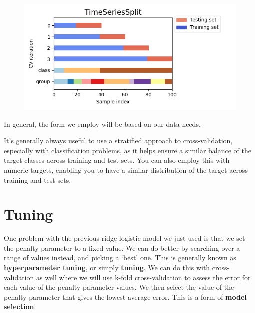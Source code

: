 \documentclass[
  letterpaper,
]{krantz}
\begin{document}
\begin{figure}
\begin{minipage}{0.50\linewidth}
\end{minipage}%
%
\begin{minipage}{0.50\linewidth}

\includegraphics{img/sklearn_k_fold_images/time_series.png}

\end{minipage}%

\end{figure}%

In general, the form we employ will be based on our data needs.

\begin{tcolorbox}[enhanced jigsaw, bottomrule=.15mm, rightrule=.15mm, colframe=quarto-callout-tip-color-frame, colback=white, breakable, arc=.35mm, left=2mm, opacityback=0, leftrule=.75mm, toprule=.15mm]

It's generally always useful to use a stratified approach to
cross-validation, especially with classification problems, as it helps
ensure a similar balance of the target classes across training and test
sets. You can also employ this with numeric targets, enabling you to
have a similar distribution of the target across training and test sets.

\end{tcolorbox}

\section{Tuning}\label{sec-ml-tuning}

One problem with the previous ridge logistic model we just used is that
we set the penalty parameter to a fixed value. We can do better by
searching over a range of values instead, and picking a `best' one. This
is generally known as \textbf{hyperparameter tuning}, or simply
\textbf{tuning}. We can do this with cross-validation as well where we
will use k-fold cross-validation to assess the error for each value of
the penalty parameter values. We then select the value of the penalty
parameter that gives the lowest average error. This is a form of
\textbf{model selection}.
\end{document}
